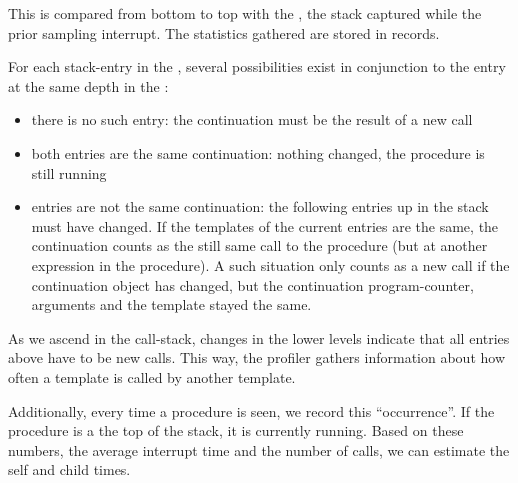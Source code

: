 This  is compared from bottom to top with the ,
the stack captured while the prior sampling interrupt.
The statistics gathered are stored in  records.

For each stack-entry in the , several possibilities exist in
conjunction to the entry at the same depth in the :
\begin{itemize}
	\item there is no such entry: the continuation must be the result of a new call
	\item both entries are the same continuation: nothing changed, the procedure is still running
	\item entries are not the same continuation:
		the following entries up in the stack must have changed. If the templates of the current
		entries are the same, the continuation counts as the still same call to the procedure (but at another
		expression in the procedure). A such situation only counts as a new call if the continuation
		object has changed, but the continuation program-counter, arguments and the template stayed the same.
\end{itemize}
As we ascend in the call-stack, changes in the lower levels indicate that all entries above have to be new calls.
This way, the profiler gathers information about how often a template is called by another template.

Additionally, every time a procedure is seen, we record this ``occurrence''. If the procedure is a the top of
the stack, it is currently running. Based on these numbers, the average interrupt time and the number of calls,
we can estimate the self and child times.


